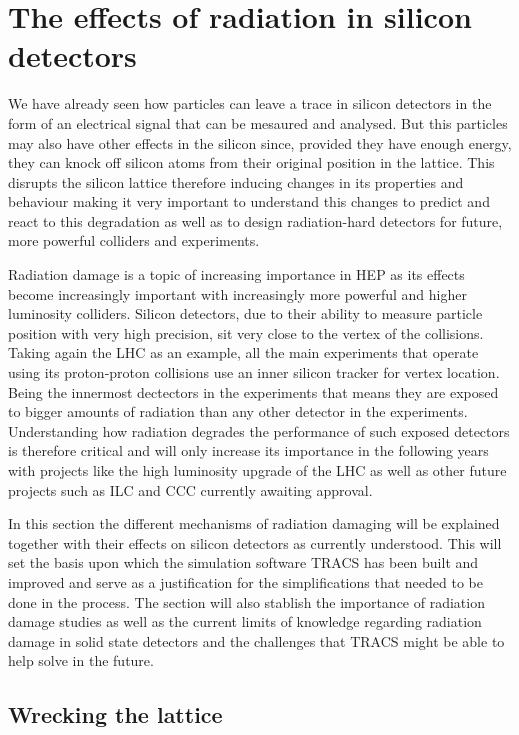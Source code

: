 \chapter{The effects of radiation in silicon detectors}

We have already seen how particles can leave a trace in silicon detectors in the form of an electrical signal that can be mesaured and analysed. But this particles may also have other effects in the silicon since, provided they have enough energy, they can knock off silicon atoms from their original position in the lattice. This disrupts the silicon lattice therefore inducing changes in its properties and behaviour making it very important to understand this changes to predict and react to this degradation as well as to design radiation-hard detectors for future, more powerful colliders and experiments. 

Radiation damage is a topic of increasing importance in HEP as its effects become increasingly important with increasingly more powerful and higher luminosity colliders. Silicon detectors, due to their ability to measure particle position with very high precision, sit very close to the vertex of the collisions. Taking again the LHC as an example, all the main experiments that operate using its proton-proton collisions use an inner silicon tracker for vertex location. Being the innermost dectectors in the experiments that means they are exposed to bigger amounts of radiation than any other detector in the experiments. Understanding how radiation degrades the performance of such exposed detectors is therefore critical and will only increase its importance in the following years with projects like the high luminosity upgrade of the LHC as well as other future projects such as ILC and CCC currently awaiting approval.

In this section the different mechanisms of radiation damaging will be explained together with their effects on silicon detectors as currently understood. This will set the basis upon which the simulation software TRACS has been built and improved and serve as a justification for the simplifications that needed to be done in the process. The section will also stablish the importance of radiation damage studies as well as the current limits of knowledge regarding radiation damage in solid state detectors and the challenges that TRACS might be able to help solve in the future.


\section{Wrecking the lattice}

